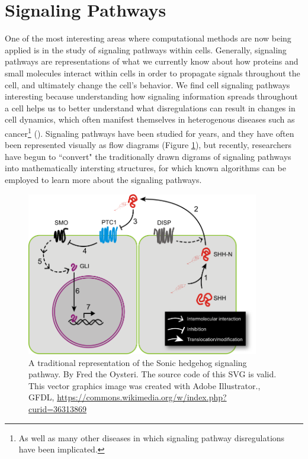 \documentclass[12pt,twoside]{reedthesis}
\theoremstyle{definition}
\begin{document}
 \section{Signaling Pathways}

 One of the most interesting areas where computational methods are now being applied is in the study of signaling pathways within cells. Generally, signaling pathways are representations of what we currently know about how proteins and small molecules interact within cells in order to propagate signals throughout the cell, and ultimately change the cell's behavior. We find cell signaling pathways interesting because understanding how signaling information spreads throughout a cell helps us to better understand what disregulations can result in changes in cell dynamics, which often manifest themselves in heterogenous diseases such as cancer\footnote{As well as many other diseases in which signaling pathway disregulations have been implicated.} (\cite{Taylor2009}). Signaling pathways have been studied for years, and they have often been represented visually as flow diagrams (Figure \ref{fig:shh}), but recently, researchers have begun to ``convert" the traditionally drawn digrams of signaling pathways into mathematically intersting structures, for which known algorithms can be employed to learn more about the signaling pathways.\par

 \begin{figure}[!h]
   \begin{center}
     \includegraphics[width=4in]{Sonic_hedgehog_pathway}
   \caption[Sonic hedgehog signal transduction.]{A traditional representation of the Sonic hedgehog signaling pathway. By Fred the Oysteri. The source code of this SVG is valid. This vector graphics image was created with Adobe Illustrator., GFDL, \url{https://commons.wikimedia.org/w/index.php?curid=36313869}}
   \label{fig:shh}
   \end{center}
 \end{figure}
\end{document}

